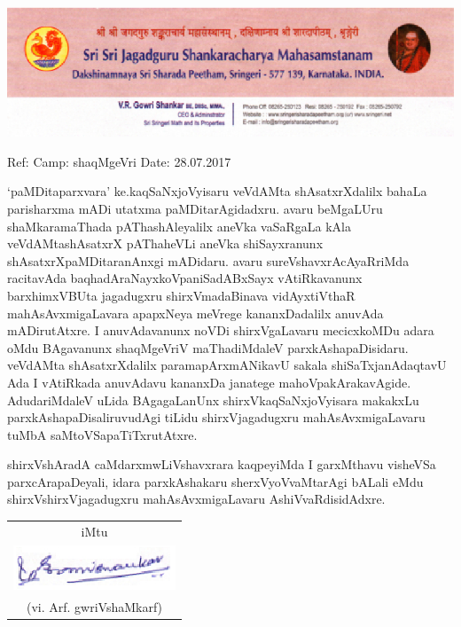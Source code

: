 \thispagestyle{empty}
\begin{center}
\includegraphics{figures/letterhead.eps}
\end{center}

\noindent
{\rm Ref:}\hfill
{\rm Camp:} shaqMgeVri\hfill
{\rm Date: 28.07.2017}
\bigskip

\noindent
`paMDitaparxvara' ke.kaqSaNxjoVyisaru veVdAMta shAsatxrXdalilx bahaLa parisharxma mADi utatxma paMDitarAgidadxru. avaru beMgaLUru shaMkaramaThada pAThashAleyalilx aneVka vaSaRgaLa kAla veVdAMtashAsatxrX pAThaheVLi aneVka shiSayxranunx shAsatxrXpaMDita\-ranAnxgi mADidaru. avaru sureVshavxrAcAyaRriMda racitavAda baqhadAraNayx\-koVpaniSadABxSayx vAtiRkavanunx barxhimxVBUta jagadugxru shirxVmadaBinava vidAyxtiVthaR mahAsAvxmigaLavara apapxNeya meVrege kananxDadalilx anuvAda mADirutAtxre. I anuvAdavanunx noVDi shirxVgaLavaru mecicxkoMDu adara oMdu BAgavanunx shaqMgeVriV maThadiMdaleV parxkAshapaDisidaru. veVdAMta shAsatxrXdalilx parama\break pArxmANikavU sakala shiSaTxjanAdaqtavU Ada I vAtiRkada anuvAdavu kananxDa janatege mahoVpakArakavAgide. AdudariMdaleV uLida BAgagaLanUnx shirxVkaqSaNx\-joVyisara makakxLu parxkAshapaDisaliruvudAgi tiLidu shirxVjagadugxru mahAsAvxmi\-gaLavaru tuMbA saMtoVSapaTiTxrutAtxre.
\medskip

\noindent
shirxVshAradA caMdarxmwLiVshavxrara kaqpeyiMda I garxMthavu visheVSa parxcArapaDeyali, idara parxkAshakaru sherxVyoVvaMtarAgi bALali eMdu shirxVshirxVjagadugxru mahAsAvxmigaLavaru AshiVvaRdisidAdxre. 

\begin{flushright}
\begin{tabular}{c}
iMtu \\
\includegraphics{figures/signature.eps}\\
(vi. Arf. gwriVshaMkarf)
\end{tabular}
\end{flushright}
